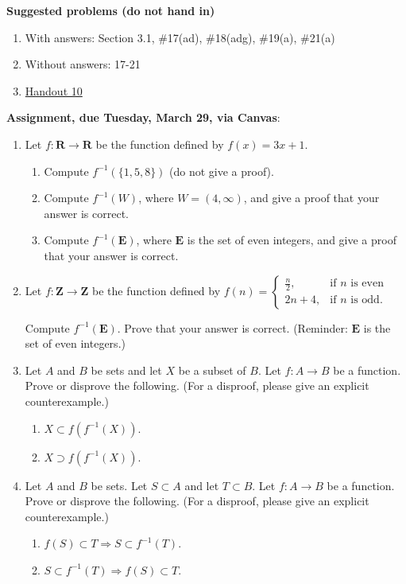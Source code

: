 \documentclass[12pt]{article}
\begin{document}
\noindent \textbf{Suggested problems (do not hand in)}

\begin{enumerate}
\item With answers: Section 3.1, \#17(ad), \#18(adg), \#19(a), \#21(a)
\item Without answers: 17-21
\item \href{https://www.math.emory.edu/~dzb/teaching/250Fall2021/handouts/250-H10-preimages.pdf}{Handout 10}
\end{enumerate}


\noindent \textbf{Assignment, due Tuesday, March 29, via Canvas}:
\begin{enumerate}
\item Let $f \colon \mathbf{R} \to \mathbf{R}$ be the function defined by $f(x) = 3x+1$. 
 \begin{enumerate}
 \item Compute $f^{-1}(\{1,5,8\})$ (do not give a proof).
 \item Compute $f^{-1}(W)$, where $W = (4,\infty)$, and give a proof that your answer is correct.
 \item Compute $f^{-1}(\mathbf{E})$, where $\mathbf{E}$ is the set of even integers, and give a proof that your answer is correct.
 \end{enumerate}

\item Let $f \colon \mathbf{Z} \to \mathbf{Z}$ be the function defined by $f(n) =
 \begin{cases}
 \frac{n}{2}, & \text{if $n$ is even} \\
 2n+4, & \text{if $n$ is odd}.
 \end{cases}
 $
 
 Compute $f^{-1}(\mathbf{E})$. Prove that your answer is correct. (Reminder: $\mathbf{E}$ is the set of even integers.)
\item Let $A$ and $B$ be sets and let $X$ be a subset of $B$. Let $f\colon A \to B$ be a function. Prove or disprove the following. (For a disproof, please give an explicit counterexample.)
 \begin{enumerate}
 \item $X \subset f(f^{-1}(X))$.
 \item $X \supset f(f^{-1}(X))$.
 \end{enumerate}

\item Let $A$ and $B$ be sets. Let $S \subset A$ and let $T \subset B$. Let $f\colon A \to B$ be a function. Prove or disprove the following. (For a disproof, please give an explicit counterexample.)
 \begin{enumerate}
 \item $f(S) \subset T \Rightarrow S \subset f^{-1}(T)$.
 \item $S \subset f^{-1}(T) \Rightarrow f(S) \subset T$.
 \end{enumerate}
 
\end{enumerate}
\end{document}
